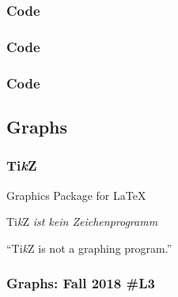 \documentclass{beamer}
\begin{document}
\begin{frame}[t]
	\frametitle{Code}
\Large

\lstset{style=mystyle}


\end{frame}

\begin{frame}[t]
	\frametitle{Code}
\Large

\lstset{style=mystyle}


\end{frame}

\begin{frame}[t]
	\frametitle{Code}
\Large

\lstset{style=mystyle}


\end{frame}

\subsection{Graphs}

\begin{frame}[t]
	\frametitle{Ti\textit{k}Z}
\Large

Graphics Package for \LaTeX

Ti\textit{k}Z {\it ist kein Zeichenprogramm}

``Ti\textit{k}Z is not a graphing program.''



\end{frame}



\begin{frame}[t, fragile]
	\frametitle{Graphs:  Fall 2018 \#L3}
\Large
\hfil
\lstset{style=mystyle}

\end{frame}

\begin{frame}[t, fragile]
	\frametitle{}
\Large
\hfil
\lstset{style=mystyle}

\end{frame}
\end{document}
